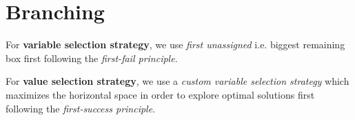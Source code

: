 \documentclass[12pt, a4paper]{article} %
\begin{document}
\section{Branching}

For \textbf{variable selection strategy}, we use \textit{first unassigned} i.e. biggest remaining box first following the \textit{first-fail principle}.

For \textbf{value selection strategy}, we use a \textit{custom variable selection strategy} which maximizes the horizontal space in order to explore optimal solutions first following the \textit{first-success principle}.
\end{document}
